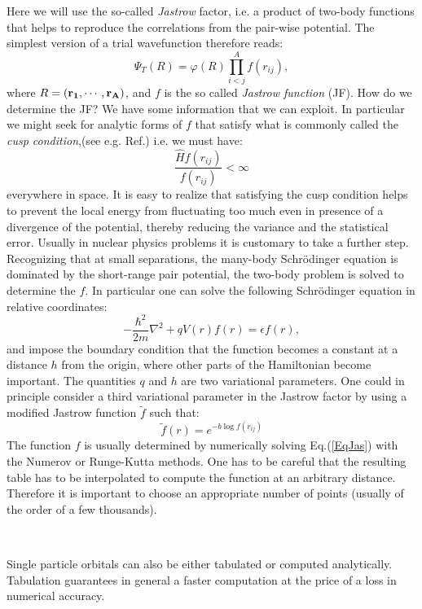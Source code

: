 Here we will use the so-called {\it Jastrow} factor, i.e. a product of two-body functions  that helps to reproduce the correlations from the pair-wise potential. The simplest version of a trial wavefunction therefore reads:
\begin{equation}
\Psi_T(R)=\varphi(R)\prod_{i<j}^Af(r_{ij}),
\end{equation}
where $R=({\bf r_1,\cdots,r_A})$, and $f$ is the so called {\it Jastrow function} (JF). How do we determine the JF? We have some information that we can exploit. In particular we might seek for analytic forms of $f$ that satisfy what is commonly called the {\it cusp condition},(see e.g. Ref.\cite{Cep77}) i.e. we must have:
\begin{equation}
\frac{\hat{H}f(r_{ij})}{f(r_{ij})}<\infty
\end{equation}
everywhere in space. It is easy to realize that satisfying the cusp condition helps to prevent the local energy from fluctuating too much even in presence of a divergence of the potential, thereby reducing the variance and the statistical error. Usually in nuclear physics problems it is customary to take a further step.
Recognizing that at small separations, the many-body Schr\"odinger equation
is dominated by the short-range pair potential,
the two-body problem is solved to determine the $f$. In particular one can solve the following Schr\"odinger equation in relative coordinates:
\begin{equation}
\label{EqJas}
-\frac{\hbar^2}{2m}\nabla^2+qV(r)f(r)=\epsilon f(r),
\end{equation}
and impose the boundary condition that the function becomes a constant at a distance $h$ from the origin, where other parts of the Hamiltonian become important.  The quantities $q$ and $h$ are two variational parameters. One could in principle consider a third variational parameter in the Jastrow factor by using a modified Jastrow function $\tilde{f}$ such that:\begin{equation}
\tilde{f}(r)=e^{-b\log f(r_{ij})}
\end{equation}
The function $f$ is usually determined by numerically solving Eq.(\ref{EqJas}) with the Numerov or Runge-Kutta methods. One has to be careful that the resulting table has to be interpolated to compute the function at an arbitrary distance. Therefore it is important to choose an appropriate number of points (usually of the order of a few thousands).  
\begin{figure}
	\
\end{figure}
Single particle orbitals can also be either tabulated or computed analytically. Tabulation guarantees in general a faster computation at the price of a loss in numerical accuracy.

